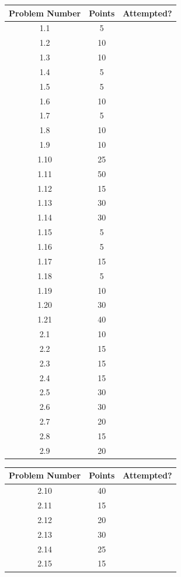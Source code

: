 \documentclass[11pt]{article}
\begin{document}
\begin{center}
\begin{tabular}{|c|c|c|}\hline
Problem Number & Points & Attempted? \\\hline
1.1 & 5 &  \\\hline
1.2 & 10 &  \\\hline
1.3 & 10 &  \\\hline
1.4 & 5 &  \\\hline
1.5 & 5 &  \\\hline
1.6 & 10 &  \\\hline
1.7 & 5 &  \\\hline
1.8 & 10 &  \\\hline
1.9 & 10 & \\\hline
1.10 & 25 & \\\hline
1.11 & 50 & \\\hline
1.12 & 15 & \\\hline
1.13 & 30 & \\\hline
1.14 & 30 & \\\hline
1.15 & 5 & \\\hline
1.16 & 5 & \\\hline
1.17 & 15 & \\\hline
1.18 & 5 & \\\hline
1.19 & 10 & \\\hline
1.20 & 30 & \\\hline
1.21 & 40 & \\\hline
2.1 & 10 & \\\hline
2.2 & 15 & \\\hline
2.3 & 15 & \\\hline
2.4 & 15 & \\\hline
2.5 & 30 & \\\hline
2.6 & 30 & \\\hline
2.7 & 20 & \\\hline
2.8 & 15 & \\\hline
2.9 & 20 & \\\hline
\end{tabular}
\quad 
\begin{tabular}{|c|c|c|}\hline
Problem Number & Points & Attempted? \\\hline
2.10 & 40 &  \\\hline
2.11 & 15 &  \\\hline
2.12 & 20 &  \\\hline
2.13 & 30 &  \\\hline
2.14 & 25 &  \\\hline
2.15 & 15 &  \\\hline

\end{tabular}
\end{center}
\end{document}
